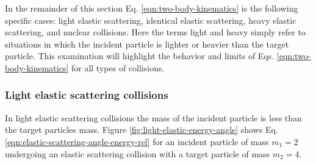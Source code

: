 In the remainder of this section Eq. \eqref{eqn:two-body-kinematics} is the following specific cases: light elastic scattering, identical elastic scattering, heavy elastic scattering, and nuclear collisions. Here the terms light and heavy simply refer to situations in which the incident particle is lighter or heavier than the target particle. This examination will highlight the behavior and limits of Eqs. \eqref{eqn:two-body-kinematics} for all types of collisions.

\subsubsection{Light elastic scattering collisions}
In light elastic scattering collisions the mass of the incident particle is less than the target particles mass. Figure \ref{fig:light-elastic-energy-angle} shows Eq. \eqref{eqn:elastic-scattering-angle-energy-rel} for an incident particle of mass $m_1 = 2$ undergoing an elastic scattering collision with a target particle of mass $m_2 = 4$. 
